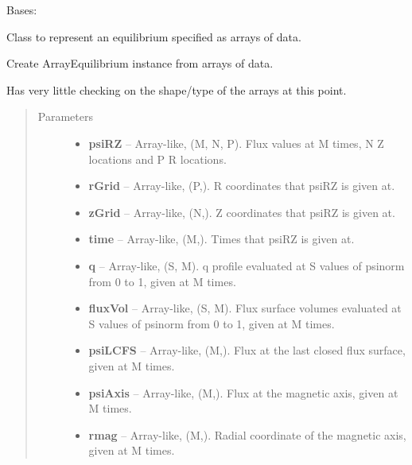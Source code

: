 \documentclass[letterpaper,10pt,english]{sphinxmanual}
\begin{document}
\begin{fulllineitems}
\label{eqtools:eqtools.FromArrays.ArrayEquilibrium}
Bases: {\hyperref[eqtools:eqtools.core.Equilibrium]{}}

Class to represent an equilibrium specified as arrays of data.

Create ArrayEquilibrium instance from arrays of data.

Has very little checking on the shape/type of the arrays at this point.
\begin{quote}\begin{description}
\item[{Parameters}] \leavevmode\begin{itemize}
\item {} 
\textbf{psiRZ} -- Array-like, (M, N, P).
Flux values at M times, N Z locations and P R locations.

\item {} 
\textbf{rGrid} -- Array-like, (P,).
R coordinates that psiRZ is given at.

\item {} 
\textbf{zGrid} -- Array-like, (N,).
Z coordinates that psiRZ is given at.

\item {} 
\textbf{time} -- Array-like, (M,).
Times that psiRZ is given at.

\item {} 
\textbf{q} -- Array-like, (S, M).
q profile evaluated at S values of psinorm from 0 to 1, given at M
times.

\item {} 
\textbf{fluxVol} -- Array-like, (S, M).
Flux surface volumes evaluated at S values of psinorm from 0 to 1,
given at M times.

\item {} 
\textbf{psiLCFS} -- Array-like, (M,).
Flux at the last closed flux surface, given at M times.

\item {} 
\textbf{psiAxis} -- Array-like, (M,).
Flux at the magnetic axis, given at M times.

\item {} 
\textbf{rmag} -- Array-like, (M,).
Radial coordinate of the magnetic axis, given at M times.


\end{itemize}
\end{description}
\end{quote}
\end{fulllineitems}
\end{document}
